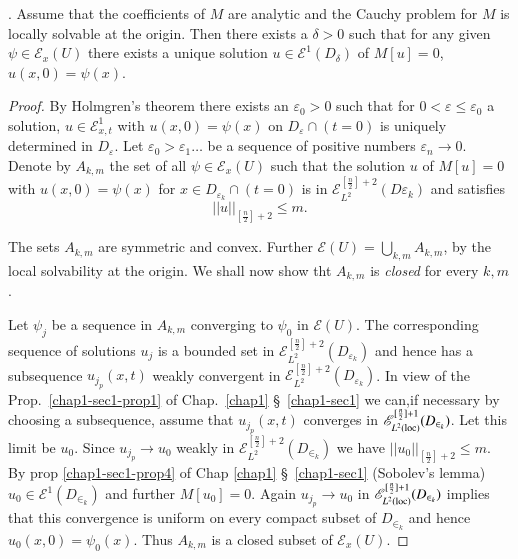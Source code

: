 \setcounter{proposition}{0}
\begin{proposition}[P.D. Lax]\label{chap2-sec1-prop1}  %
\cite{key1}. Assume that the coefficients of $M$ are analytic and the Cauchy
 problem for $M$ is locally solvable at the origin. Then there exists
 a  $\delta > 0$ such that for any given $\psi \in
 \mathscr{E}_x(U)$ there exists a unique solution $u \in
 \mathscr{E}^1 (D_\delta)$  of $M[u] = 0$, $u(x, 0)=\psi (x)$. 
\end{proposition}

\begin{proof}
By Holmgren's theorem there exists an $\varepsilon_0 > 0$ such that
for $0 < \varepsilon \leq \varepsilon_0$ a solution,  $u \in
\mathscr{E}^1_{x, t}$ with $u(x, 0) = \psi (x)$ on $D_\varepsilon \cap
(t=0)$ is uniquely determined in $D_\varepsilon$. Let $\varepsilon_0
> \varepsilon_1 \ldots $ be a sequence of positive numbers
$\varepsilon_n \to 0$. Denote by $A_{k, m}$  the set of all $\psi
\in\mathscr{E}_x (U)$ such  that the solution $u$ of $M
            [u]=0$ with $u(x, 0)=\psi (x)$ for $x \in
            D_{\varepsilon_{k}} \cap (t = 0)$ is in
            $\mathscr{E}^{[\frac{n}{2}]+2}_{L^2} (D \varepsilon _k)$
            and satisfies 
$$
|| u ||_{[\frac{n}{2}]+2 } \leq m. 
$$


The sets $A_{k, m}$ are symmetric and convex.  Further $\mathscr{E}
(U) = \bigcup\limits_{k, m} A_{k, m}$, by the local solvability at
the origin. We shall now show tht $A_{k, m}$ is \textit{closed} for
every $k, m$. 

Let $\psi_j$ be a sequence in $A_{k, m}$ converging to $\psi_0$ in 
$\mathscr{E}(U)$. The corresponding sequence of solutions $u_j$ is a
bounded set in
$\mathscr{E}^{[\frac{n}{2}]+2}_{L^2}(D_{\varepsilon_{k}})$ and hence
has a subsequence $u_{j_p} (x, t)$ weakly convergent in
$\mathscr{E}^{[\frac{n}{2}]+2}_{L^2} (D_{\varepsilon_k})$. In view of
the Prop.~\ref{chap1-sec1-prop1} of Chap.~\ref{chap1} \S\ \ref{chap1-sec1} 
we can,\pageoriginale if necessary by choosing a
subsequence, 
assume that $ u_{j_p}(x,  t)$ converges in $\mathscr{E}_{L^2
  (\operatorname{loc})}^{[\frac{n}{2}]+1} (D_{\in _k})$. Let this limit be
$u_0$. Since $u_{j_p } \to u_0$ weakly in
$\mathscr{E}_{L^2}^{[\frac{n}{2}]+2} (D_{\in _k})$ we have $|| u_0 ||
_{[\frac{n}{2}]+2} \leq m$. By prop \ref{chap1-sec1-prop4} of Chap
\ref{chap1} \S\ \ref{chap1-sec1} (Sobolev's 
lemma) $u_0 \in \mathscr{E}^1 (D _{\in_k} )$ and further $ M [u_0] =
0$. Again $ u_{j_p} \to u_0$ in $\mathscr{E}_{L^2
  (\operatorname{loc})}^{[\frac{n}{2}]+1} (D_{\in _k})$ implies that this
convergence is uniform on every compact subset of $D_{\in_k}$ and
hence $ u_0 (x,  0) = \psi_0 (x)$. Thus $A_{k, m}$ is a closed subset
of $\mathcal{E}_x (U)$.  


\end{proof}
